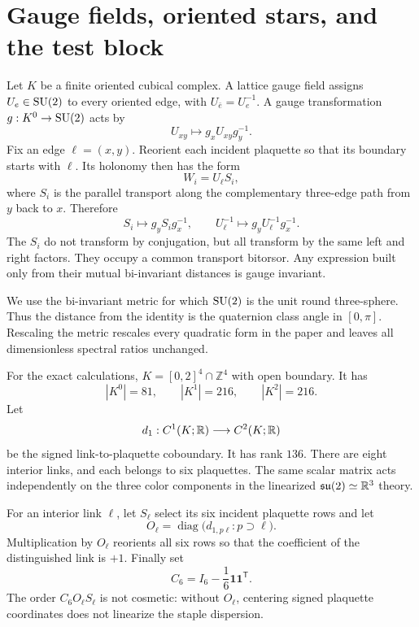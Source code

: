 \section{Gauge fields, oriented stars, and the test block}
\label{sec:setup}

Let $K$ be a finite oriented cubical complex.  A lattice gauge field assigns
$U_e\in\mathrm{SU}(2)$ to every oriented edge, with $U_{\bar e}=U_e^{-1}$.  A gauge
transformation $g:K^0\to\mathrm{SU}(2)$ acts by
\[
  U_{xy}\longmapsto g_xU_{xy}g_y^{-1}.
\]
Fix an edge $\ell=(x,y)$.  Reorient each incident plaquette so that its
boundary starts with $\ell$.  Its holonomy then has the form
\[
  W_i=U_\ell S_i,
\]
where $S_i$ is the parallel transport along the complementary three-edge path
from $y$ back to $x$.  Therefore
\[
 S_i\longmapsto g_yS_i g_x^{-1},\qquad
 U_\ell^{-1}\longmapsto g_yU_\ell^{-1}g_x^{-1}.
\]
The $S_i$ do not transform by conjugation, but all transform by the same left
and right factors.  They occupy a common transport bitorsor.  Any expression
built only from their mutual bi-invariant distances is gauge invariant.

We use the bi-invariant metric for which $\mathrm{SU}(2)$ is the unit round three-sphere.
Thus the distance from the identity is the quaternion class angle in
$[0,\pi]$.  Rescaling the metric rescales every quadratic form in the paper
and leaves all dimensionless spectral ratios unchanged.

For the exact calculations, $K=[0,2]^4\cap\mathbb Z^4$ with open boundary.
It has
\[
  |K^0|=81,\qquad |K^1|=216,\qquad |K^2|=216.
\]
Let
\[
 d_1:C^1(K;\mathbb{R})\longrightarrow C^2(K;\mathbb{R})
\]
be the signed link-to-plaquette coboundary.  It has rank $136$.  There are
eight interior links, and each belongs to six plaquettes.  The same scalar
matrix acts independently on the three color components in the linearized
$\mathfrak{su}(2)\simeq\mathbb{R}^3$ theory.

For an interior link $\ell$, let $S_\ell$ select its six incident plaquette
rows and let
\[
 O_\ell=\operatorname{diag}\bigl(d_{1,p\ell}:p\supset\ell\bigr).
\]
Multiplication by $O_\ell$ reorients all six rows so that the coefficient of
the distinguished link is $+1$.  Finally set
\[
 C_6=I_6-\frac16\mathbf1\mathbf1^\mathsf T.
\]
The order $C_6O_\ell S_\ell$ is not cosmetic: without $O_\ell$, centering
signed plaquette coordinates does not linearize the staple dispersion.
